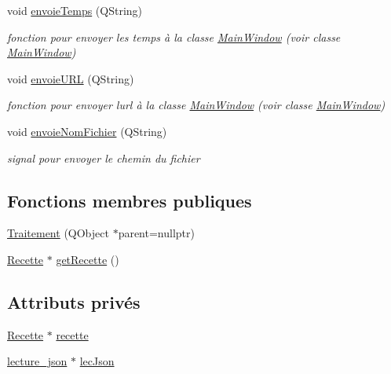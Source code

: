 \begin{DoxyCompactItemize}
void \hyperlink{classTraitement_ae57543af34e05b74a7af460c0e74e87f}{envoie\+Temps} (Q\+String)
\begin{DoxyCompactList}\small\item\em fonction pour envoyer les temps à la classe \hyperlink{classMainWindow}{Main\+Window} (voir classe \hyperlink{classMainWindow}{Main\+Window}) \end{DoxyCompactList}\item 
void \hyperlink{classTraitement_acc099bf1113669c2e061e8897c3eaeca}{envoie\+U\+RL} (Q\+String)
\begin{DoxyCompactList}\small\item\em fonction pour envoyer l\textquotesingle{}url à la classe \hyperlink{classMainWindow}{Main\+Window} (voir classe \hyperlink{classMainWindow}{Main\+Window}) \end{DoxyCompactList}\item 
void \hyperlink{classTraitement_a7a3bc123acfc8e079ef93889d47c9829}{envoie\+Nom\+Fichier} (Q\+String)
\begin{DoxyCompactList}\small\item\em signal pour envoyer le chemin du fichier \end{DoxyCompactList}\end{DoxyCompactItemize}
\subsection*{Fonctions membres publiques}
\begin{DoxyCompactItemize}
\item 
\hyperlink{classTraitement_a36edd9e6ce6e72cfef7f9c857c3c9cf2}{Traitement} (Q\+Object $\ast$parent=nullptr)
\item 
\hyperlink{classRecette}{Recette} $\ast$ \hyperlink{classTraitement_aba3c99b92a3b6d429e4479294267af9d}{get\+Recette} ()
\end{DoxyCompactItemize}
\subsection*{Attributs privés}
\begin{DoxyCompactItemize}
\item 
\hyperlink{classRecette}{Recette} $\ast$ \hyperlink{classTraitement_afc8ac78bded6d17a86323544aa00d91b}{recette}
\item 
\hyperlink{classlecture__json}{lecture\+\_\+json} $\ast$ \hyperlink{classTraitement_ac7e6ff3bfc54975b1c8831a2ad8fc9a4}{lec\+Json}
\end{DoxyCompactItemize}


